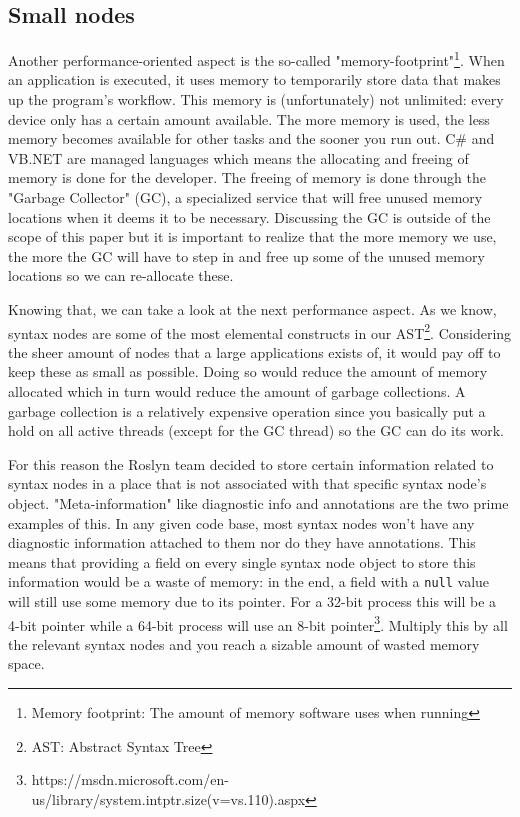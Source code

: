 \subsection{Small nodes}
\label{sec:small-nodes}

Another performance-oriented aspect is the so-called "memory-footprint"\footnote{Memory footprint: The amount of memory software uses when running}. When an application is executed, it uses memory to temporarily store data that makes up the program's workflow. This memory is (unfortunately) not unlimited: every device only has a certain amount available. The more memory is used, the less memory becomes available for other tasks and the sooner you run out. C\# and VB.NET are managed languages which means the allocating and freeing of memory is done for the developer. The freeing of memory is done through the "Garbage Collector" (GC), a specialized service that will free unused memory locations when it deems it to be necessary. Discussing the GC is outside of the scope of this paper but it is important to realize that the more memory we use, the more the GC will have to step in and free up some of the unused memory locations so we can re-allocate these.\parencite{Todorov2013}

Knowing that, we can take a look at the next performance aspect. As we know, syntax nodes are some of the most elemental constructs in our AST\footnote{AST: Abstract Syntax Tree}. Considering the sheer amount of nodes that a large applications exists of, it would pay off to keep these as small as possible. Doing so would reduce the amount of memory allocated which in turn would reduce the amount of garbage collections. A garbage collection is a relatively expensive operation since you basically put a hold on all active threads (except for the GC thread) so the GC can do its work.\parencite{Botelho2014}

For this reason the Roslyn team decided to store certain information related to syntax nodes in a place that is not associated with that specific syntax node's object.\parencite{Sadov2014} "Meta-information" like diagnostic info and annotations are the two prime examples of this. In any given code base, most syntax nodes won't have any diagnostic information attached to them nor do they have annotations. This means that providing a field on every single syntax node object to store this information would be a waste of memory: in the end, a field with a \verb|null| value will still use some memory due to its pointer. For a 32-bit process this will be a 4-bit pointer while a 64-bit process will use an 8-bit pointer\footnote{https://msdn.microsoft.com/en-us/library/system.intptr.size(v=vs.110).aspx}. Multiply this by all the relevant syntax nodes and you reach a sizable amount of wasted memory space.


